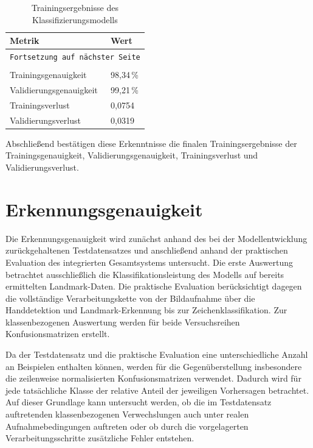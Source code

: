 \begin{longtable}{|p{}|p{}|}
    \hline
    \textbf{Metrik} & \textbf{Wert} \\
    \hline
    \endfirsthead
    \hline
    \multicolumn{2}{r}{\texttt{Fortsetzung auf nächster Seite}} \\
    \endfoot
    \caption{Trainingsergebnisse des Klassifizierungsmodells}
    \label{tab:trainingsergebnisse} \\
    \endlastfoot
    Trainingsgenauigkeit        & 98,34\,\% \\
    \hline
    Validierungsgenauigkeit     & 99,21\,\% \\
    \hline
    Trainingsverlust    & 0,0754 \\
    \hline
    Validierungsverlust & 0,0319 \\
    \hline
\end{longtable}

Abschließend bestätigen diese Erkenntnisse die finalen Trainingsergebnisse der Trainingsgenauigkeit, Validierungsgenauigkeit, Trainingsverlust und Validierungsverlust.

\section{Erkennungsgenauigkeit}\label{sec:erkennungsgenauigkeit}

Die Erkennungsgenauigkeit wird zunächst anhand des bei der Modellentwicklung zurückgehaltenen Testdatensatzes und anschließend anhand der praktischen Evaluation des integrierten Gesamtsystems untersucht.
Die erste Auswertung betrachtet ausschließlich die Klassifikationsleistung des Modells auf bereits 
ermittelten Landmark-Daten. Die praktische Evaluation berücksichtigt dagegen die vollständige Verarbeitungskette von der Bildaufnahme über die Handdetektion und Landmark-Erkennung bis zur Zeichenklassifikation. Zur klassenbezogenen Auswertung werden für beide Versuchsreihen Konfusionsmatrizen erstellt.

Da der Testdatensatz und die praktische Evaluation eine unterschiedliche Anzahl an Beispielen enthalten können, werden für die Gegenüberstellung insbesondere die zeilenweise normalisierten Konfusionsmatrizen verwendet. Dadurch wird für jede tatsächliche Klasse der relative Anteil der jeweiligen Vorhersagen betrachtet. Auf dieser Grundlage kann untersucht werden, ob die im Testdatensatz auftretenden klassenbezogenen Verwechslungen auch unter realen Aufnahmebedingungen auftreten oder ob durch die vorgelagerten Verarbeitungsschritte zusätzliche Fehler entstehen.

